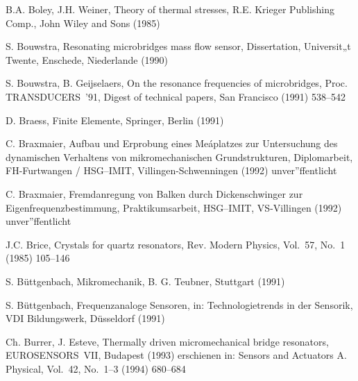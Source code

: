 \begin{thebibliography}{xxx}
 B.A. Boley, J.H. Weiner, Theory of thermal stresses, R.E. Krieger Publishing
 Comp., John Wiley and Sons (1985)


 S. Bouwstra, Resonating microbridges mass flow sensor, Dissertation,
 Universit„t Twente, Enschede, Niederlande (1990)

 S. Bouwstra, B. Geijselaers, On the resonance frequencies of microbridges,
 Proc. TRANSDUCERS~'91, Digest of technical papers, San Francisco
 (1991) 538--542

 D. Braess, Finite Elemente, Springer, Berlin (1991)

 C. Braxmaier, Aufbau und Erprobung eines Meáplatzes zur Untersuchung des
 dynamischen Verhaltens von mikromechanischen Grundstrukturen,
 Diplomarbeit, FH-Furtwangen / HSG--IMIT, Villingen-Schwenningen (1992)
 unver”ffentlicht

 C. Braxmaier, Fremdanregung von Balken durch Dickenschwinger zur
 Eigenfrequenzbestimmung, Praktikumsarbeit, HSG--IMIT, VS-Villingen (1992)
 unver”ffentlicht

 J.C. Brice, Crystals for quartz resonators, Rev. Modern Physics,
 Vol.~57, No.~1 (1985) 105--146



 S. Büttgenbach, Mikromechanik, B. G. Teubner, Stuttgart (1991)

 S. Büttgenbach, Frequenzanaloge Sensoren, in: Technologietrends in der
 Sensorik, VDI Bildungswerk, Düsseldorf (1991)


 Ch. Burrer, J. Esteve, Thermally driven micromechanical bridge resonators,
 EUROSENSORS~VII, Budapest (1993) erschienen in: Sensors and Actuators A.
 Physical, Vol.~42, No.~1--3 (1994) 680--684


\end{thebibliography}
